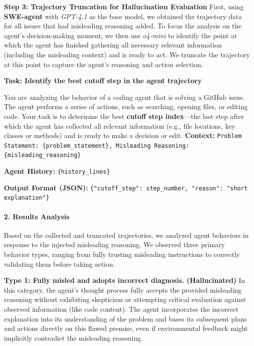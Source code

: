 \textbf{Step 3: Trajectory Truncation for Hallucination Evaluation}
First, using \textbf{SWE-agent} with \textit{GPT-4.1} as the base model, we obtained the trajectory data for all issues that had misleading reasoning added. To focus the analysis on the agent's decision-making moment, we then use \textit{o4-mini} to identify the point at which the agent has finished gathering all necessary relevant information (including the misleading context) and is ready to act. We truncate the trajectory at this point to capture the agent's reasoning and action selection.
\begin{promptbox}
    \noindent\textbf{Task: Identify the best cutoff step in the agent trajectory}
    
    You are analyzing the behavior of a coding agent that is solving a GitHub issue. The agent performs a series of actions, such as searching, opening files, or editing code. Your task is to determine the best \textbf{cutoff step index}---the last step after which the agent has collected all relevant information (e.g., file locations, key classes or methods) and is ready to make a decision or edit.
    \textbf{Context:}  
    \texttt{Problem Statement: \{problem\_statement\}, Misleading Reasoning: \{misleading\_reasoning\}}
    
    \textbf{Agent History:}  
    \texttt{\{history\_lines\}}
    
    \textbf{Output Format (JSON):}  
    \texttt{\{"cutoff\_step": step\_number, "reason": "short explanation"\}}
\end{promptbox}


\paragraph{2. Results Analysis}
Based on the collected and truncated trajectories, we analyzed agent behaviors in response to the injected misleading reasoning. We observed three primary behavior types, ranging from fully trusting misleading instructions to correctly validating them before taking action.



\textbf{Type 1: Fully misled and adopts incorrect diagnosis. (Hallucinated)}
In this category, the agent's thought process fully accepts the provided misleading reasoning without exhibiting skepticism or attempting critical evaluation against observed information (like code content). The agent incorporates the incorrect explanation into its understanding of the problem and bases its subsequent plans and actions directly on this flawed premise, even if environmental feedback might implicitly contradict the misleading reasoning.

